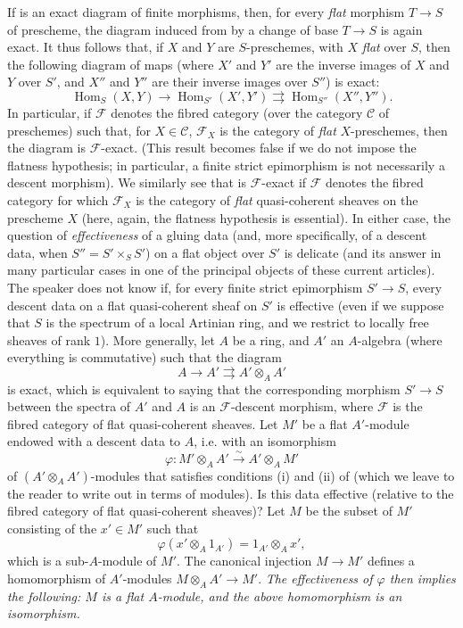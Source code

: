 \label{fga3.i-a.2.c}
If  is an exact diagram of finite morphisms, then, for every \emph{flat} morphism $T\to S$ of prescheme, the diagram induced from  by a change of base $T\to S$ is again exact.
It thus follows that, if $X$ and $Y$ are $S$-preschemes, with $X$ \emph{flat} over $S$, then the following diagram of maps (where $X'$ and $Y'$ are the inverse images of $X$ and $Y$ over $S'$, and $X''$ and $Y''$ are their inverse images over $S''$) is exact:
\[
    \operatorname{Hom}_S(X,Y) \to
    \operatorname{Hom}_{S'}(X',Y') \rightrightarrows
    \operatorname{Hom}_{S''}(X'',Y'').
\]
In particular, if $\mathcal{F}$ denotes the fibred category (over the category $\mathcal{C}$ of preschemes) such that, for $X\in\mathcal{C}$, $\mathcal{F}_X$ is the category of \emph{flat} $X$-preschemes, then the diagram  is $\mathcal{F}$-exact.
(This result becomes false if we do not impose the flatness hypothesis; in particular, a finite strict epimorphism is not necessarily a descent morphism).
We similarly see that  is $\mathcal{F}$-exact if $\mathcal{F}$ denotes the fibred category for which $\mathcal{F}_X$ is the category of \emph{flat} quasi-coherent sheaves on the prescheme $X$ (here, again, the flatness hypothesis is essential).
In either case, the question of \emph{effectiveness} of a gluing data (and, more specifically, of a descent data, when $S''=S'\times_S S'$) on a flat object over $S'$ is delicate (and its answer in many particular cases in one of the principal objects of these current articles).
The speaker does not know if, for every finite strict epimorphism $S'\to S$, every descent data on a flat quasi-coherent sheaf on $S'$ is effective (even if we suppose that $S$ is the spectrum of a local Artinian ring, and we restrict to locally free sheaves of rank $1$).
More generally, let $A$ be a ring, and $A'$ an $A$-algebra (where everything is commutative) such that the diagram
\[
    A \to
    A' \rightrightarrows
    A'\otimes_A A'
\]
is exact, which is equivalent to saying that the corresponding morphism $S'\to S$ between the spectra of $A'$ and $A$ is an $\mathcal{F}$-descent morphism, where $\mathcal{F}$ is the fibred category of flat quasi-coherent sheaves.
Let $M'$ be a flat $A'$-module endowed with a descent data to $A$, i.e. with an isomorphism
\[
    \varphi\colon M'\otimes_A A'
    \xrightarrow{\sim} A'\otimes_A M'
\]
of $(A'\otimes_A A')$-modules that satisfies conditions (i) and (ii) of  (which we leave to the reader to write out in terms of modules).
Is this data effective (relative to the fibred category of flat quasi-coherent sheaves)?
Let $M$ be the subset of $M'$ consisting of the $x'\in M'$ such that
\[
    \varphi(x'\otimes_A 1_{A'}) = 1_{A'}\otimes_A x',
\]
which is a sub-$A$-module of $M'$.
The canonical injection $M\to M'$ defines a homomorphism of $A'$-modules $M\otimes_A A'\to M'$.
\emph{The effectiveness of $\varphi$ then implies the following: $M$ is a flat $A$-module, and the above homomorphism is an isomorphism.}

